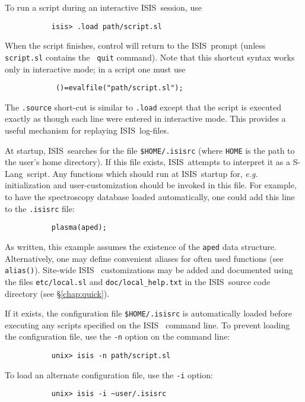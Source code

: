 \documentclass{book}
\newcommand{\isisx}{{\sc ISIS~}}
\newcommand{\slang}{{\sc S-Lang}}
\begin{document}
{To run a script during an interactive \isisx session, use
\begin{verbatim}
           isis> .load path/script.sl
\end{verbatim}
When the script finishes, control will
return to the \isisx prompt (unless {\tt script.sl} contains the {\tt
quit} command).  Note that this shortcut syntax works only in interactive
mode; in a script one must use
\begin{verbatim}
            ()=evalfile("path/script.sl");
\end{verbatim}
The {\tt .source} short-cut is similar to {\tt .load} except that
the script is executed exactly as though each line were entered in
interactive mode.  This provides a useful mechanism for replaying
\isisx log-files.

At startup, \isisx searches for the file {\tt \$HOME/.isisrc} (where
{\tt HOME} is the path to the user's home directory).  If this file
exists, \isisx attempts to interpret it as a \slang{}ript.  Any
functions which should run at \isisx startup for, {\it e.g.}
initialization and user-customization should be invoked in this file.
For example, to have the spectroscopy database
loaded automatically, one could add this line to the {\tt .isisrc} file:
\begin{verbatim}
           plasma(aped);
\end{verbatim}
As written, this example assumes the existence of the {\tt aped}
data structure. Alternatively, one may define convenient aliases for
often used functions (see {\tt alias()}).  Site-wide \isisx
customizations may be added and documented using the files
{\tt etc/local.sl} and {\tt doc/local\_help.txt} in the \isisx source
code directory (see \S\ref{chap:quick}).

If it exists, the configuration file {\tt \$HOME/.isisrc} is automatically
loaded before executing any scripts specified on the \isisx
command line.  To prevent loading the configuration file,
use the {\tt -n} option on the command line:
\begin{verbatim}
           unix> isis -n path/script.sl
\end{verbatim}
To load an alternate configuration file, use the \verb|-i| option:
\begin{verbatim}
           unix> isis -i ~user/.isisrc
\end{verbatim}

}
\end{document}
